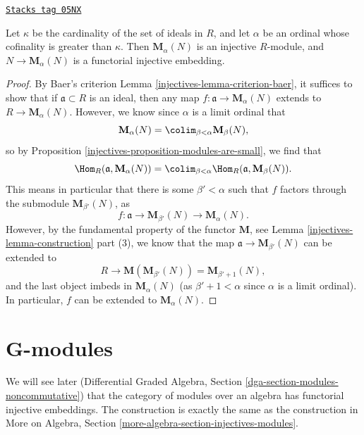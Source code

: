 \begin{theorem}
\label{injectives-theorem-baer-grothendieck}
\href{https://stacks.math.columbia.edu/tag/05NX}{\texttt{Stacks tag 05NX}}

Let $\kappa$ be the cardinality of the set of ideals in $R$, and
let $\alpha$ be an ordinal whose cofinality is greater than
$\kappa$. Then $\mathbf{M}_\alpha(N)$ is an injective $R$-module,
and $N \to \mathbf{M}_\alpha(N)$ is a functorial injective embedding.
\end{theorem}

\begin{proof}

By Baer's criterion
Lemma \ref{injectives-lemma-criterion-baer},
it suffices to show that if $\mathfrak{a} \subset R$ is an ideal, then
any map $f : \mathfrak{a} \to \mathbf{M}_\alpha(N)$ extends to
$R \to \mathbf{M}_\alpha(N)$. However, we know since $\alpha$ is a limit
ordinal that
$$
\mathbf{M}_{\alpha}(N) =
\colim_{\beta < \alpha} \mathbf{M}_{\beta}(N),
$$
so by
Proposition \ref{injectives-proposition-modules-are-small},
we find that
$$
\Hom_R(\mathfrak{a}, \mathbf{M}_{\alpha}(N)) =
\colim_{\beta < \alpha} \Hom_R(\mathfrak a, \mathbf{M}_{\beta}(N)).
$$
This means in particular that there is some $\beta' < \alpha$
such that $f$ factors through the submodule $\mathbf{M}_{\beta'}(N)$, as
$$
f : \mathfrak{a} \to \mathbf{M}_{\beta'}(N) \to
\mathbf{M}_{\alpha}(N).
$$
However, by the fundamental property of the functor $\mathbf{M}$,
see Lemma \ref{injectives-lemma-construction} part (3),
we know that the map $\mathfrak{a} \to \mathbf{M}_{\beta'}(N)$
can be extended to
$$
R \to \mathbf{M}( \mathbf{M}_{\beta'}(N)) =
\mathbf{M}_{\beta' + 1}(N),
$$
and the last object imbeds in $\mathbf{M}_{\alpha}(N)$ (as
$\beta' + 1 < \alpha$ since $\alpha$ is a limit ordinal).
In particular, $f$ can be extended to $\mathbf{M}_{\alpha}(N)$.
\end{proof}

\section{G-modules}
\label{injectives-section-G-modules}
We will see later
(Differential Graded Algebra, Section \ref{dga-section-modules-noncommutative})
that the category of modules over an algebra has
functorial injective embeddings. The construction is exactly the same
as the construction in
More on Algebra, Section \ref{more-algebra-section-injectives-modules}.

